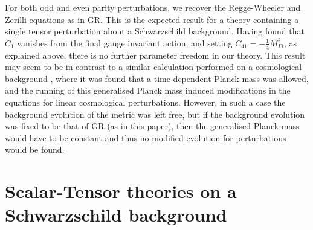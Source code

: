 \documentclass[10pt,twocolumn,preprintnumbers,amsmath,amssymb,nofootinbib
,superscriptaddress]{revtex4-1}
\begin{document}
For both odd and even parity perturbations, we recover the Regge-Wheeler and Zerilli equations as in GR. This is the expected result for a theory containing a single tensor perturbation about a Schwarzschild background. Having found that $C_1$ vanishes from the final gauge invariant action, and setting $C_{41}=-\frac{1}{4}M_{Pl}^2$, as explained above, there is no further parameter freedom in our theory. This result may seem to be in contrast to a similar calculation performed on a cosmological background \cite{Lagos:2016wyv,Tattersall:2017eav}, where it was found that a time-dependent Planck mass was allowed, and the running of this generalised Planck mass induced modifications in the equations for linear cosmological perturbations. However, in such a case the background evolution of the metric was left free, but if the background evolution was fixed to be that of GR (as in this paper), then the generalised Planck mass would have to be constant and thus no modified evolution for perturbations would be found.


\section{Scalar-Tensor theories on a Schwarzschild background}\label{SecSTBH}
\end{document}

